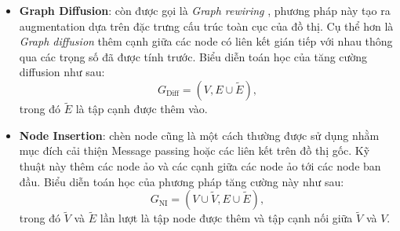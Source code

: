 \begin{itemize}
    \item[] \textbf{Graph Diffusion}: còn được gọi là \textit{Graph rewiring} \cite{graphs-curvature}, phương pháp này tạo ra augmentation dựa trên đặc trưng cấu trúc toàn cục của đồ thị. Cụ thể hơn là \textit{Graph diffusion} thêm cạnh giữa các node có liên kết gián tiếp với nhau thông qua các trọng số đã được tính trước. Biểu diễn toán học của tăng cường diffusion như sau:
    \begin{equation}
        G_{\text{Diff}} = (V, E \cup \tilde{E}),
    \end{equation}
    trong đó $\tilde{E}$ là tập cạnh được thêm vào.

    \item[] \textbf{Node Insertion}: chèn node cũng là một cách thường được sử dụng nhằm mục đích cải thiện Message passing hoặc các liên kết trên đồ thị gốc. Kỹ thuật này thêm các node ảo và các cạnh giữa các node ảo tới các node ban đầu. Biểu diễn toán học của phương pháp tăng cường này như sau:
    \begin{equation}
        G_{\text{NI}} = (V \cup \tilde{V}, E \cup \tilde{E}),
    \end{equation}
    trong đó $\tilde{V}$ và $\tilde{E}$ lần lượt là tập node được thêm và tập cạnh nối giữa $\tilde{V}$ và $V$.


\end{itemize}
